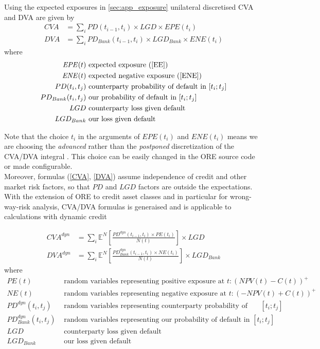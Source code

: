 \documentclass[12pt, a4paper]{article}
\newcommand\E{\ensuremath{\mathbb{E}}}
\newcommand{\CVA}{\mathit{CVA}}
\newcommand{\DVA}{\mathit{DVA}}
\newcommand{\EPE}{\mathit{EPE}}
\newcommand{\ENE}{\mathit{ENE}}
\newcommand{\PE}{\mathit{PE}}
\newcommand{\NE}{\mathit{NE}}
\newcommand{\PD}{\mathit{PD}}
\newcommand{\LGD}{\mathit{LGD}}
\begin{document}
{{\begin{appendix}
Using the expected exposures in \ref{sec:app_exposure} unilateral discretised CVA and DVA are given by \cite{Lichters}
\begin{align}
\CVA &= \sum_{i} \PD(t_{i-1},t_i)\times\LGD\times \EPE(t_i) \label{CVA}\\
\DVA &= \sum_{i} \PD_{Bank}(t_{i-1},t_i)\times\LGD_{Bank}\times \ENE(t_i) \label{DVA}
\end{align}
where
\begin{align*}
\EPE(t) & \mbox{ expected exposure (\ref{EE})}\\
\ENE(t) & \mbox{ expected negative exposure (\ref{ENE})}\\
PD(t_i,t_j) & \mbox{ counterparty probability of default in } [t_i;t_j]\\
PD_{Bank}(t_i,t_j) & \mbox{ our probability of default in } [t_i;t_j]\\
LGD & \mbox{ counterparty loss given default}\\
LGD_{Bank} & \mbox{ our loss given default}\\
\end{align*}

Note that the choice $t_i$ in the arguments of $\EPE(t_i)$ and $\ENE(t_i)$ means we are choosing the {\em advanced}
rather than the {\em postponed} discretization of the CVA/DVA integral \cite{BrigoMercurio}. This choice can be easily
changed in the ORE source code or made configurable. \\

Moreover, formulas (\ref{CVA}, \ref{DVA}) assume independence of credit and other market risk factors, so that $\PD$ and
$\LGD$ factors are outside the expectations. With the extension of ORE to credit asset classes and in particular for
wrong-way-risk analysis, CVA/DVA formulas is generaised and is applicable to calculations with dynamic credit

\begin{align}
\CVA^{dyn} &= \sum_{i} \E^N\left[\frac{\PD^{dyn}(t_{i-1},t_i)\times \PE(t_i)}{N(t)} \right]\times\LGD \label{CVA_dynamic} \\
\DVA^{dyn} &= \sum_{i} \E^N\left[\frac{\PD^{dyn}_{Bank}(t_{i-1},t_i)\times \NE(t_i)}{N(t)} \right]\times\LGD_{Bank} \label{DVA_dynamic}
\end{align}
where
\begin{align*}
\PE(t) & \mbox{ random variables representing positive exposure at } t: (NPV(t)-C(t))^+\\
\NE(t) & \mbox{ random variables representing negative exposure at } t: (-NPV(t)+C(t))^+\\
PD^{dyn}(t_i,t_j) & \mbox{ random variables representing counterparty probability of default in } [t_i;t_j]\\
PD^{dyn}_{Bank}(t_i,t_j) & \mbox{ random variables representing our probability of default in } [t_i;t_j]\\
LGD & \mbox{ counterparty loss given default}\\
LGD_{Bank} & \mbox{ our loss given default}\\
\end{align*}


\end{appendix}}}
\end{document}
